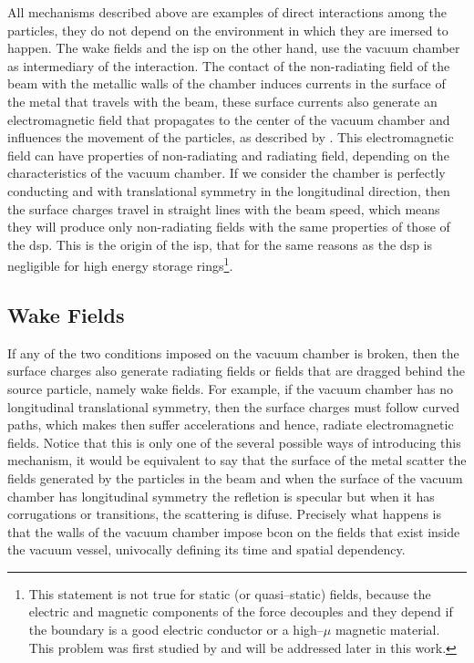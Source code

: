     All mechanisms described above are examples of direct interactions among the particles, they do not depend on the environment in which they are imersed to happen. The wake fields and the \gls{isp} on the other hand, use the vacuum chamber as intermediary of the interaction. The contact of the non-radiating field of the beam with the metallic walls of the chamber induces currents in the surface of the metal that travels with the beam, these surface currents also generate an electromagnetic field that propagates to the center of the vacuum chamber and influences the movement of the particles, as described by . This electromagnetic field can have properties of non-radiating and radiating field, depending on the characteristics of the vacuum chamber. If we consider the chamber is perfectly conducting and with translational symmetry in the longitudinal direction, then the surface charges travel in straight lines with the beam speed, which means they will produce only non-radiating fields with the same properties of those of the \gls{dsp}. This is the origin of the \gls{isp}, that for the same reasons as the \gls{dsp} is negligible for high energy storage rings\footnote{This statement is not true for static (or quasi--static) fields, because the electric and magnetic components of the force decouples and they depend if the boundary is a good electric conductor or a high--$\mu$ magnetic material. This problem was first studied by  and will be addressed later in this work.}.

\subsection{Wake Fields}\label{ssec:wake_fields}

    If any of the two conditions imposed on the vacuum chamber is broken, then the surface charges also generate radiating fields or fields that are dragged behind the source particle, namely wake fields. For example, if the vacuum chamber has no longitudinal translational symmetry, then the surface charges must follow curved paths, which makes then suffer accelerations and hence, radiate electromagnetic fields. Notice that this is only one of the several possible ways of introducing this mechanism, it would be equivalent to say that the surface of the metal scatter the fields generated by the particles in the beam and when the surface of the vacuum chamber has longitudinal symmetry the refletion is specular but when it has corrugations or transitions, the scattering is difuse. Precisely what happens is that the walls of the vacuum chamber impose \gls{bcon} on the fields that exist inside the vacuum vessel, univocally defining its time and spatial dependency.

